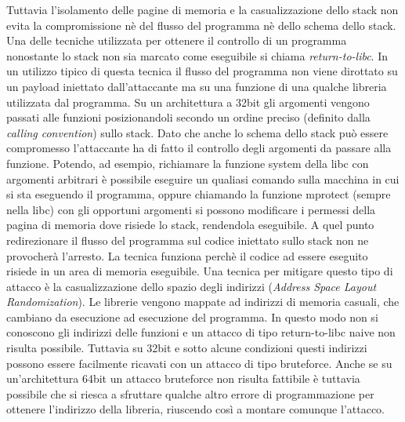 Tuttavia l'isolamento delle pagine di memoria e la casualizzazione
dello stack non evita la compromissione nè del flusso del programma nè
dello schema dello stack. Una delle tecniche utilizzata per ottenere
il controllo di un programma nonostante lo stack non sia marcato come
eseguibile si chiama \emph{return-to-libc}\cite{c0ntex}. In un utilizzo
tipico di questa tecnica il flusso del programma non viene dirottato
su un payload iniettato dall'attaccante ma su una funzione di una
qualche libreria utilizzata dal programma. Su un architettura a 32bit
gli argomenti vengono passati alle funzioni posizionandoli secondo un
ordine preciso (definito dalla \emph{calling convention}) sullo
stack. Dato che anche lo schema dello stack può essere compromesso
l'attaccante ha di fatto il controllo degli argomenti da passare alla
funzione. Potendo, ad esempio, richiamare la funzione system della
libc con argomenti arbitrari è possibile eseguire un qualiasi comando
sulla macchina in cui si sta eseguendo il programma, oppure chiamando
la funzione mprotect (sempre nella libc) con gli opportuni argomenti
si possono modificare i permessi della pagina di memoria dove risiede
lo stack, rendendola eseguibile. A quel punto redirezionare il flusso
del programma sul codice iniettato sullo stack non ne provocherà
l'arresto. La tecnica funziona perchè il codice ad essere eseguito
risiede in un area di memoria eseguibile. Una tecnica per mitigare
questo tipo di attacco è la casualizzazione dello spazio degli
indirizzi (\emph{Address Space Layout Randomization}). Le librerie
vengono mappate ad indirizzi di memoria casuali, che cambiano da
esecuzione ad esecuzione del programma. In questo modo non si
conoscono gli indirizzi delle funzioni e un attacco di tipo
return-to-libc naive non risulta possibile. Tuttavia su 32bit e sotto
alcune condizioni questi indirizzi possono essere facilmente ricavati
con un attacco di tipo bruteforce\cite{Shacham:2004}. Anche se su
un'architettura 64bit un attacco bruteforce non risulta fattibile è
tuttavia possibile che si riesca a sfruttare qualche altro errore di
programmazione per ottenere l'indirizzo della libreria, riuscendo così
a montare comunque l'attacco.

